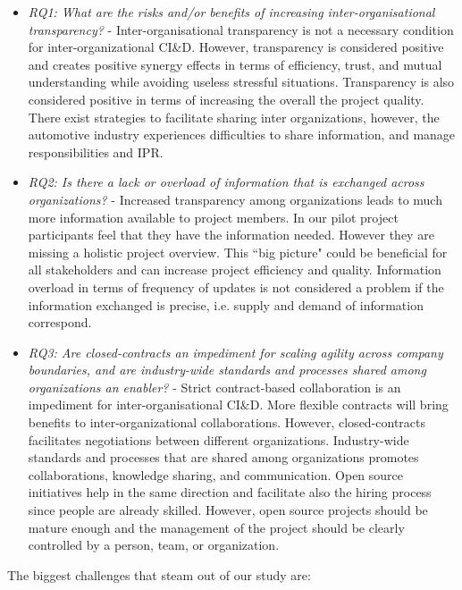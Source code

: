 \begin{itemize}
\item {\em RQ1: What are the risks and/or benefits of increasing inter-organisational transparency?} - Inter-organisational transparency is not a necessary condition for inter-organizational CI\&D. However, transparency is considered positive and creates positive synergy effects in terms of efficiency, trust, and mutual understanding while avoiding useless stressful situations. Transparency is also considered positive in terms of increasing the overall the project quality. 
There exist strategies to facilitate sharing inter organizations, however, the automotive industry experiences difficulties to share information, and manage responsibilities and IPR.
\item {\em RQ2: Is there a lack or overload of information that is exchanged across organizations?} - Increased transparency among organizations leads to much more information available to project members. In our pilot project participants feel that they have the information needed. However they are missing a holistic project overview. This ``big picture" could be beneficial for all stakeholders and can increase project efficiency and quality. Information overload in terms of frequency of updates is not considered a problem if the information exchanged is precise, i.e. supply and demand of information correspond.
\item {\em RQ3: Are closed-contracts an impediment for scaling agility across company boundaries, and 
are industry-wide standards and processes shared among organizations an enabler?} - Strict contract-based collaboration is an impediment for inter-organisational CI\&D. More flexible contracts will bring benefits to inter-organizational collaborations. However, closed-contracts facilitates negotiations between different organizations. Industry-wide standards and processes that are shared among organizations promotes collaborations, knowledge sharing, and communication. Open source initiatives help in the same direction and facilitate also the hiring process since people are already skilled. However, open source projects should be mature enough and the management of the project should be clearly controlled by a person, team, or organization.
\end{itemize}


The biggest challenges that steam out of our study are: 

